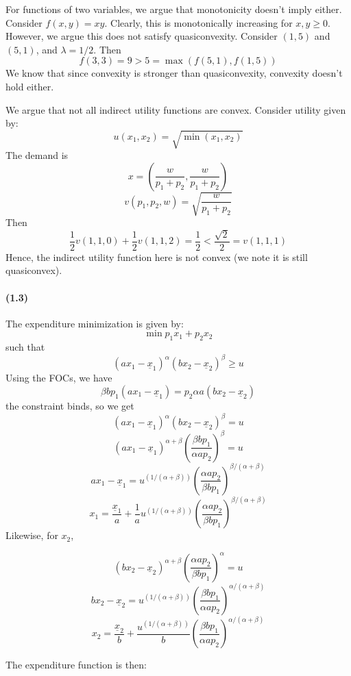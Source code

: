 \documentclass[10pt,letter]{article}
\begin{document}
For functions of two variables, we argue that monotonicity doesn't imply either. Consider $f(x,y) = xy$. Clearly, this is monotonically increasing for $x, y \ge 0$. However, we argue this does not satisfy quasiconvexity. Consider $(1,5)$ and $(5,1)$, and $\lambda = 1/2$. Then
\[ f(3,3) = 9 > 5 = \max(f(5,1), f(1,5)) \]
We know that since convexity is stronger than quasiconvexity, convexity doesn't hold either.

We argue that not all indirect utility functions are convex. Consider utility given by:
\[ u(x_1, x_2) = \sqrt{\min(x_1,x_2)} \]
The demand is
\[ x = \left(\frac{w}{p_1+p_2}, \frac{w}{p_1+p_2} \right) \]
\[ v(p_1, p_2, w) = \sqrt{\frac{w}{p_1+p_2}}\]
Then
\[ \frac{1}{2} v(1, 1, 0) + \frac{1}{2} v(1, 1, 2) = \frac{1}{2} < \frac{\sqrt{2}}{2} = v(1,1,1)  \]
Hence, the indirect utility function here is not convex (we note it is still quasiconvex).
\paragraph{(1.3)}
The expenditure minimization is given by:
\[ \min p_1 x_1 + p_2 x_2 \]
such that
\[ (ax_1 - \underline{x}_1)^\alpha(bx_2 - \underline{x}_2)^\beta \ge u \]
Using the FOCs, we have
\[ \beta b p_1(ax_1 - \underline{x}_1) = p_2 \alpha a (b x_2 - \underline{x}_2) \]
the constraint binds, so we get
\[ (ax_1 - \underline{x}_1)^\alpha(bx_2 - \underline{x}_2)^\beta = u \]
\[ (ax_1 - \underline{x}_1)^{\alpha+\beta} \left(\frac{\beta b p_1}{\alpha a p_2}\right)^\beta = u  \]
\[ ax_1 - \underline{x}_1  = u^{(1/(\alpha+\beta))} \left(\frac{\alpha a p_2}{\beta b p_1}\right)^{\beta/(\alpha+\beta)}\]
\[ x_1  = \frac{\underline{x}_1}{a} + \frac{1}{a}u^{(1/(\alpha+\beta))} \left(\frac{\alpha a p_2}{\beta b p_1}\right)^{\beta/(\alpha+\beta)}\]
Likewise, for $x_2$,

\[ (bx_2 - \underline{x}_2)^{\alpha+\beta} \left(\frac{\alpha a p_2}{\beta b p_1}\right)^\alpha = u  \]
\[ bx_2 - \underline{x}_2 = u^{(1/(\alpha+\beta))} \left(\frac{\beta b p_1}{\alpha a p_2}\right)^{\alpha/(\alpha + \beta)} \]
\[ x_2  = \frac{\underline{x}_2}{b} + \frac{u^{(1/(\alpha+\beta))}}{b} \left(\frac{\beta b p_1}{\alpha a p_2}\right)^{\alpha/(\alpha + \beta)} \]

The expenditure function is then:
\end{document}
